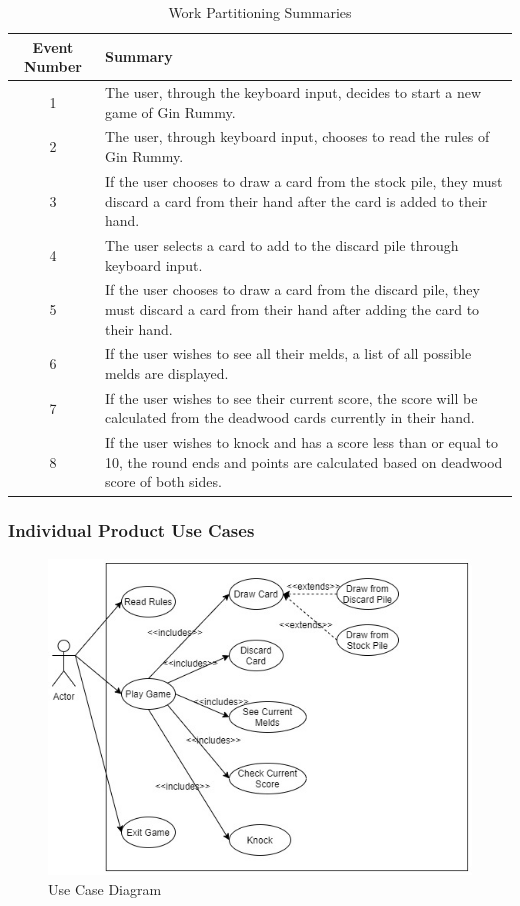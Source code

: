 \documentclass[12pt, titlepage]{article}
\begin{document}
\begin{table}[H]
\caption{Work Partitioning Summaries}
    \centering
    \begin{tabular}{|c|p{10cm}|}
    \hline
    \textbf{Event Number} & \textbf{Summary} \\
    \hline
    1 & The user, through the keyboard input, decides to start a new game of Gin Rummy. \\
    \hline
    2 & The user, through keyboard input, chooses to read the rules of Gin Rummy. \\
    \hline
    3 & If the user chooses to draw a card from the stock pile, they must discard a card from their hand after the card is added to their hand. \\
    \hline
    4 & The user selects a card to add to the discard pile through keyboard input. \\
    \hline
    5 & If the user chooses to draw a card from the discard pile, they must discard a card from their hand after adding the card to their hand. \\
    \hline
    6 & If the user wishes to see all their melds, a list of all possible melds are displayed. \\
    \hline
    7 & If the user wishes to see their current score, the score will be calculated from the deadwood cards currently in their hand. \\
    \hline
    8 & If the user wishes to knock and has a score less than or equal to 10, the round ends and points are calculated based on deadwood score of both sides. \\
    \hline
    \end{tabular}
\end{table}
\subsubsection{Individual Product Use Cases}

\begin{figure}[H]
    \centering
    \includegraphics[scale=0.5]{3xa3UseCase.jpg}
    \caption{Use Case Diagram}
    \label{fig:useCase}
\end{figure}
\end{document}
